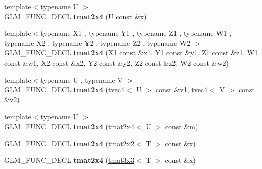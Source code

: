 \begin{DoxyCompactItemize}
\item 
\hypertarget{structglm_1_1detail_1_1tmat2x4_a03f772ad4ebee440631b9cb0a738ac28}{}{\footnotesize template$<$typename U $>$ }\\G\+L\+M\+\_\+\+F\+U\+N\+C\+\_\+\+D\+E\+C\+L {\bfseries tmat2x4} (U const \&x)\label{structglm_1_1detail_1_1tmat2x4_a03f772ad4ebee440631b9cb0a738ac28}

\item 
\hypertarget{structglm_1_1detail_1_1tmat2x4_a77fe9faca8e8861e4869fa09b0b19d54}{}{\footnotesize template$<$typename X1 , typename Y1 , typename Z1 , typename W1 , typename X2 , typename Y2 , typename Z2 , typename W2 $>$ }\\G\+L\+M\+\_\+\+F\+U\+N\+C\+\_\+\+D\+E\+C\+L {\bfseries tmat2x4} (X1 const \&x1, Y1 const \&y1, Z1 const \&z1, W1 const \&w1, X2 const \&x2, Y2 const \&y2, Z2 const \&z2, W2 const \&w2)\label{structglm_1_1detail_1_1tmat2x4_a77fe9faca8e8861e4869fa09b0b19d54}

\item 
\hypertarget{structglm_1_1detail_1_1tmat2x4_a69bd317a5f087319096249d9639442f1}{}{\footnotesize template$<$typename U , typename V $>$ }\\G\+L\+M\+\_\+\+F\+U\+N\+C\+\_\+\+D\+E\+C\+L {\bfseries tmat2x4} (\hyperlink{structglm_1_1detail_1_1tvec4}{tvec4}$<$ U $>$ const \&v1, \hyperlink{structglm_1_1detail_1_1tvec4}{tvec4}$<$ V $>$ const \&v2)\label{structglm_1_1detail_1_1tmat2x4_a69bd317a5f087319096249d9639442f1}

\item 
\hypertarget{structglm_1_1detail_1_1tmat2x4_aad8759b0cf4e809304f75f24ee007aad}{}{\footnotesize template$<$typename U $>$ }\\G\+L\+M\+\_\+\+F\+U\+N\+C\+\_\+\+D\+E\+C\+L {\bfseries tmat2x4} (\hyperlink{structglm_1_1detail_1_1tmat2x4}{tmat2x4}$<$ U $>$ const \&m)\label{structglm_1_1detail_1_1tmat2x4_aad8759b0cf4e809304f75f24ee007aad}

\item 
\hypertarget{structglm_1_1detail_1_1tmat2x4_a99a7f8713b447d8bdb2da21b045a75fe}{}G\+L\+M\+\_\+\+F\+U\+N\+C\+\_\+\+D\+E\+C\+L {\bfseries tmat2x4} (\hyperlink{structglm_1_1detail_1_1tmat2x2}{tmat2x2}$<$ T $>$ const \&x)\label{structglm_1_1detail_1_1tmat2x4_a99a7f8713b447d8bdb2da21b045a75fe}

\item 
\hypertarget{structglm_1_1detail_1_1tmat2x4_a025ab21514405a293a5f692d05c58593}{}G\+L\+M\+\_\+\+F\+U\+N\+C\+\_\+\+D\+E\+C\+L {\bfseries tmat2x4} (\hyperlink{structglm_1_1detail_1_1tmat3x3}{tmat3x3}$<$ T $>$ const \&x)\label{structglm_1_1detail_1_1tmat2x4_a025ab21514405a293a5f692d05c58593}


\end{DoxyCompactItemize}
